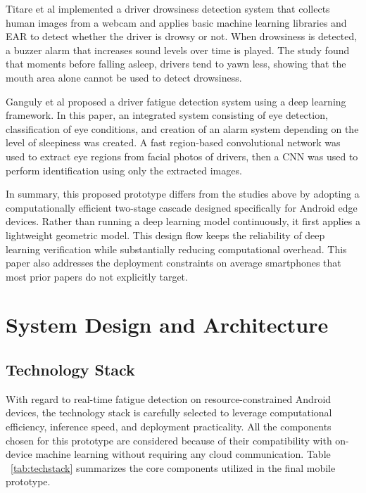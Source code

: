 \documentclass[pdflatex,sn-mathphys-num]{sn-jnl}
\theoremstyle{thmstyleone}%
\theoremstyle{thmstyletwo}%
\theoremstyle{thmstylethree}%
\begin{document}
	Titare et al  \cite{bib20} implemented a driver drowsiness detection system that collects human images from a webcam and applies basic machine learning libraries and EAR to detect whether the driver is drowsy or not. When drowsiness is detected, a buzzer alarm that increases sound levels over time is played. The study found that moments before falling asleep, drivers tend to yawn less, showing that the mouth area alone cannot be used to detect drowsiness.
	
	Ganguly et al  \cite{bib21} proposed a driver fatigue detection system using a deep learning framework. In this paper, an integrated system consisting of eye detection, classification of eye conditions, and creation of an alarm system depending on the level of sleepiness was created. A fast region-based convolutional network was used to extract eye regions from facial photos of drivers, then a CNN was used to perform identification using only the extracted images. 
	
	In summary, this proposed prototype differs from the studies above by adopting a  computationally efficient two-stage cascade designed specifically for Android edge devices. Rather than running a deep learning model continuously, it first applies a lightweight geometric model. This design flow keeps the reliability of deep learning verification while substantially reducing computational overhead. This paper also addresses the deployment constraints on average smartphones that most prior papers do not explicitly target.
	
	
	\section{System Design and Architecture}\label{sec:design}
	
	\subsection{Technology Stack}\label{sec:stack}
	With regard to real-time fatigue detection on resource-constrained Android devices, the technology stack is carefully selected to leverage computational efficiency, inference speed, and deployment practicality. All the components chosen for this prototype are considered because of their compatibility with on-device machine learning without requiring any cloud communication. Table ~\ref{tab:techstack} summarizes the core components utilized in the final mobile prototype.
	
\end{document}
